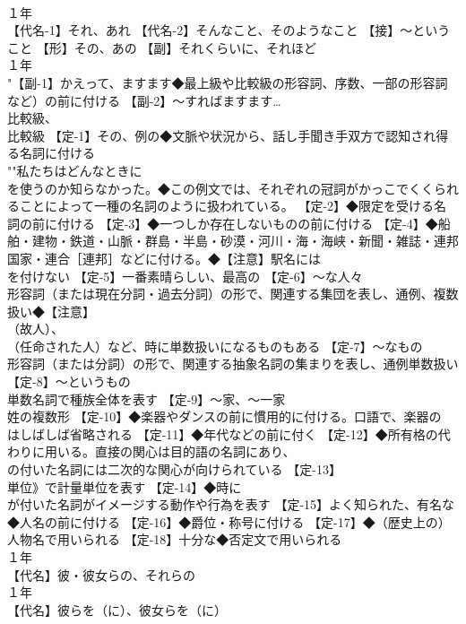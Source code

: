 \documentclass[8pt]{extreport}
\begin{document}
\begin{CJK}{UTF8}{min}
\\	１年	
\\	【代名-1】それ、あれ 【代名-2】そんなこと、そのようなこと 【接】～ということ 【形】その、あの 【副】それくらいに、それほど
\\	１年	
\\	"【副-1】かえって、ますます◆最上級や比較級の形容詞、序数、一部の形容詞
\\	など）の前に付ける 【副-2】～すればますます…
\\	比較級、
\\	比較級 【定-1】その、例の◆文脈や状況から、話し手聞き手双方で認知され得る名詞に付ける 
\\	""私たちはどんなときに 
\\	を使うのか知らなかった。◆この例文では、それぞれの冠詞がかっこでくくられることによって一種の名詞のように扱われている。 【定-2】◆限定を受ける名詞の前に付ける 【定-3】◆一つしか存在しないものの前に付ける 【定-4】◆船舶・建物・鉄道・山脈・群島・半島・砂漠・河川・海・海峡・新聞・雑誌・連邦国家・連合［連邦］などに付ける。◆【注意】駅名には 
\\	を付けない 【定-5】一番素晴らしい、最高の 【定-6】～な人々
\\	形容詞（または現在分詞・過去分詞）の形で、関連する集団を表し、通例、複数扱い◆【注意】
\\	（故人）、
\\	（任命された人）など、時に単数扱いになるものもある 【定-7】～なもの
\\	形容詞（または分詞）の形で、関連する抽象名詞の集まりを表し、通例単数扱い 【定-8】～というもの
\\	単数名詞で種族全体を表す 【定-9】～家、～一家
\\	姓の複数形 【定-10】◆楽器やダンスの前に慣用的に付ける。口語で、楽器の 
\\	はしばしば省略される 【定-11】◆年代などの前に付く 【定-12】◆所有格の代わりに用いる。直接の関心は目的語の名詞にあり、
\\	の付いた名詞には二次的な関心が向けられている 【定-13】
\\	単位》で計量単位を表す 【定-14】◆時に 
\\	が付いた名詞がイメージする動作や行為を表す 【定-15】よく知られた、有名な◆人名の前に付ける 【定-16】◆爵位・称号に付ける 【定-17】◆（歴史上の）人物名で用いられる 【定-18】十分な◆否定文で用いられる
\\	１年	
\\	【代名】彼・彼女らの、それらの
\\	１年	
\\	【代名】彼らを（に）、彼女らを（に）

\end{CJK}
\end{document}

